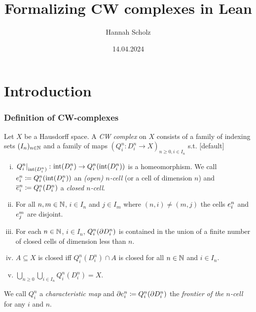 \documentclass{beamer}
\title{Formalizing CW complexes in Lean}
\author{Hannah Scholz}
\institute[MI]{Mathematical Institute of the University of Bonn}
\date{14.04.2024}
\begin{document}
\frame{\titlepage}

\section{Introduction}

\begin{frame}
\frametitle{Definition of CW-complexes}
\fontsize{10pt}{5}\selectfont
  Let $X$ be a Hausdorff space.
    A \emph{CW complex} on $X$ consists of a family of indexing sets $(I_n)_{n \in \bN}$ and a family of maps $(Q_i^n\colon D_i^n\rightarrow X)_{n \ge 0, i \in I_n}$ s.t.
    [default]
    \begin{enumerate}[(i)]
        \item $\restrict{Q_i^n}{\interior{D_i^n}}\colon \interior{D_i^n} \rightarrow Q_i^n(\interior{D_i^n})$ is a homeomorphism. We call $\openCell{n}{i} \coloneq Q_i^n(\interior{D_i^n})$ an \emph{(open) $n$-cell} (or a cell of dimension $n$)
        and $\closedCell{n}{i} \coloneq Q_i^n(D_i^n)$ a \emph{closed $n$-cell}.
        \item For all $n, m \in \bN$, $i \in I_n$ and $j \in I_m$ where $(n, i) \ne (m, j)$ the cells $\openCell{n}{i}$ and $\openCell{m}{j}$ are disjoint.
        \item For each $n \in \bN$, $i \in I_n$, $Q_i^n(\boundary D_i^n)$ is contained in the union of a finite number of closed cells of dimension less than $n$.
        \item $A \subseteq X$ is closed iff $Q_i^n(D_i^n) \cap A$ is closed for all $n \in \bN$ and $i \in I_n$.
        \item $\bigcup_{n \ge 0}\bigcup_{i \in I_n} Q_i^n(D_i^n) = X$.
    \end{enumerate}
    We call $Q_i^n$ a \emph{characteristic map} and $\cellFrontier{n}{i} \coloneq Q_i^n(\boundary D_i^n)$ the \emph{frontier of the $n$-cell} for any $i$ and $n$.
\end{frame}
\end{document}
